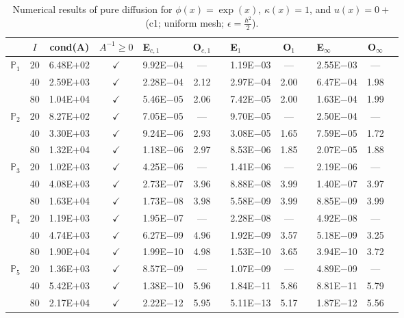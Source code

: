 \begin{table}[H]
\centering
\caption{Numerical results of pure diffusion for $\phi(x)=\exp(x)$, $\kappa(x)=1$, and $u(x)=0+$ (c1; uniform mesh; $\epsilon=\frac{h^2}{2}$).}
\begin{tabular}{@{}l c c c l c c l c c l c c@{}}
\toprule
 & $I$ & cond(A) & $A^{-1}\geq 0$ &  E$_{c,1}$ & O$_{c,1}$ && E$_1$ & O$_1$ && E$_{\infty}$ & O$_{\infty}$\\
\midrule
\multirow{3}{*}{$\mathbb{P}_{1}$}
 & 20 & 6.48E$+$02 & $\checkmark$ & 9.92E$-$04 & --- && 1.19E$-$03 & --- && 2.55E$-$03 & ---\\
 & 40 & 2.59E$+$03 & $\checkmark$ & 2.28E$-$04 & 2.12 && 2.97E$-$04 & 2.00 && 6.47E$-$04 & 1.98\\
 & 80 & 1.04E$+$04 & $\checkmark$ & 5.46E$-$05 & 2.06 && 7.42E$-$05 & 2.00 && 1.63E$-$04 & 1.99\\
\midrule
\multirow{3}{*}{$\mathbb{P}_{2}$}
 & 20 & 8.27E$+$02 & $\checkmark$ & 7.05E$-$05 & --- && 9.70E$-$05 & --- && 2.50E$-$04 & ---\\
 & 40 & 3.30E$+$03 & $\checkmark$ & 9.24E$-$06 & 2.93 && 3.08E$-$05 & 1.65 && 7.59E$-$05 & 1.72\\
 & 80 & 1.32E$+$04 & $\checkmark$ & 1.18E$-$06 & 2.97 && 8.53E$-$06 & 1.85 && 2.07E$-$05 & 1.88\\
\midrule
\multirow{3}{*}{$\mathbb{P}_{3}$}
 & 20 & 1.02E$+$03 & $\checkmark$ & 4.25E$-$06 & --- && 1.41E$-$06 & --- && 2.19E$-$06 & ---\\
 & 40 & 4.08E$+$03 & $\checkmark$ & 2.73E$-$07 & 3.96 && 8.88E$-$08 & 3.99 && 1.40E$-$07 & 3.97\\
 & 80 & 1.63E$+$04 & $\checkmark$ & 1.73E$-$08 & 3.98 && 5.58E$-$09 & 3.99 && 8.85E$-$09 & 3.99\\
\midrule
\multirow{3}{*}{$\mathbb{P}_{4}$}
 & 20 & 1.19E$+$03 & $\checkmark$ & 1.95E$-$07 & --- && 2.28E$-$08 & --- && 4.92E$-$08 & ---\\
 & 40 & 4.74E$+$03 & $\checkmark$ & 6.27E$-$09 & 4.96 && 1.92E$-$09 & 3.57 && 5.18E$-$09 & 3.25\\
 & 80 & 1.90E$+$04 & $\checkmark$ & 1.99E$-$10 & 4.98 && 1.53E$-$10 & 3.65 && 3.94E$-$10 & 3.72\\
\midrule
\multirow{3}{*}{$\mathbb{P}_{5}$}
 & 20 & 1.36E$+$03 & $\checkmark$ & 8.57E$-$09 & --- && 1.07E$-$09 & --- && 4.89E$-$09 & ---\\
 & 40 & 5.42E$+$03 & $\checkmark$ & 1.38E$-$10 & 5.96 && 1.84E$-$11 & 5.86 && 8.81E$-$11 & 5.79\\
 & 80 & 2.17E$+$04 & $\checkmark$ & 2.22E$-$12 & 5.95 && 5.11E$-$13 & 5.17 && 1.87E$-$12 & 5.56\\
\bottomrule
\end{tabular}
\end{table}